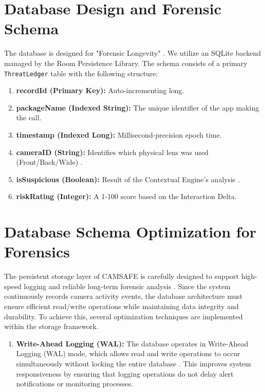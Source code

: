 \documentclass[12pt,a4paper]{report}
\begin{document}
\begin{enumerate}
    \section{Database Design and Forensic Schema}
    The database is designed for "Forensic Longevity" \cite{smarthome}. We utilize an SQLite backend managed by the Room Persistence Library. The schema consists of a primary \texttt{ThreatLedger} table with the following structure:
    \begin{enumerate}
        \item \textbf{recordId (Primary Key):} Auto-incrementing long.
        \item \textbf{packageName (Indexed String):} The unique identifier of the app making the call.
        \item \textbf{timestamp (Indexed Long):} Millisecond-precision epoch time.
        \item \textbf{cameraID (String):} Identifies which physical lens was used (Front/Back/Wide) \cite{androidhal}.
        \item \textbf{isSuspicious (Boolean):} Result of the Contextual Engine's analysis \cite{contextaware}.
        \item \textbf{riskRating (Integer):} A 1-100 score based on the Interaction Delta.
    \end{enumerate}

  \section{Database Schema Optimization for Forensics}
The persistent storage layer of CAMSAFE is carefully designed to support
high-speed logging and reliable long-term forensic analysis \cite{smarthome}.
Since the system continuously records camera activity events, the database
architecture must ensure efficient read/write operations while maintaining
data integrity and durability. To achieve this, several optimization techniques
are implemented within the storage framework.

\begin{enumerate}

\item \textbf{Write-Ahead Logging (WAL):}  
The database operates in Write-Ahead Logging (WAL) mode, which allows read and
write operations to occur simultaneously without locking the entire database
\cite{smarthome}. This improves system responsiveness by ensuring that logging
operations do not delay alert notifications or monitoring processes.


\end{enumerate}
\end{enumerate}
\end{document}
